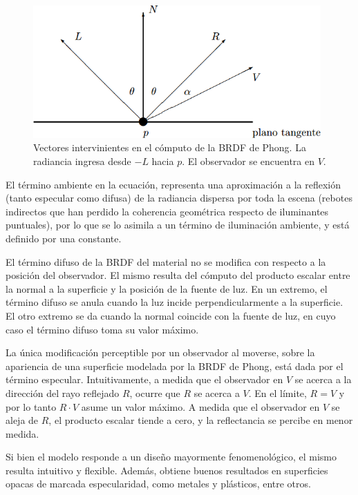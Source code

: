 \begin{figure}
\center
\includegraphics[width=11cm]{figures/phongVecs}
\caption[Vectores intervinientes en el cómputo de la BRDF de Phong]{Vectores intervinientes en el cómputo de la BRDF de Phong. La radiancia ingresa desde $-L$ hacia $p$. El observador se encuentra en $V$.}
\label{fg:phongVecs}
\end{figure}

El término ambiente en la ecuación, representa una aproximación a la reflexión (tanto especular como difusa) de la radiancia dispersa por toda la escena (rebotes indirectos que han perdido la coherencia geométrica respecto de iluminantes puntuales), por lo que se lo asimila a un término de iluminación ambiente, y está definido por una constante.

El término difuso de la BRDF del material no se modifica con respecto a la posición del observador.
El mismo resulta del cómputo del producto escalar entre la normal a la superficie y la posición de la fuente de luz.
En un extremo, el término difuso se anula cuando la luz incide perpendicularmente a la superficie.
El otro extremo se da cuando la normal coincide con la fuente de luz, en cuyo caso el término difuso toma su valor máximo.

La única modificación perceptible por un observador al moverse, sobre la apariencia de una superficie modelada por la BRDF de Phong, está dada por el término especular.
Intuitivamente, a medida que el observador en $V$ se acerca a la dirección del rayo reflejado $R$, ocurre que $R$ se acerca a $V$. En el límite, $R = V$
y por lo tanto $R \cdot V$ asume un valor máximo.
A medida que el observador en $V$ se aleja de $R$, el producto escalar tiende a cero, y la reflectancia se percibe en menor medida.

Si bien el modelo responde a un diseño mayormente fenomenológico, el mismo resulta intuitivo y flexible.
Además, obtiene buenos resultados en superficies opacas de marcada especularidad, como metales y plásticos, entre otros.

